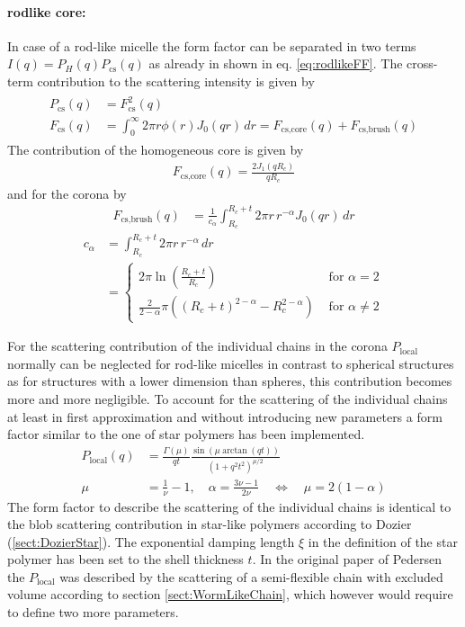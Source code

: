\noindent
\paragraph{rodlike core:}
In case of a rod-like micelle the form factor can be separated in two terms $I(q) =
P_H(q)P_\text{cs}(q)$ as already in shown in eq. \ref{eq:rodlikeFF}. The cross-term contribution to the scattering
intensity is given by
\begin{align}
\begin{split}
P_\text{cs}(q) &=  F_\text{cs}^2(q) \\
F_\text{cs}(q) &= \int_0^\infty 2\pi r \phi(r) J_0(qr)\,dr
                = F_\text{cs,core}(q)+F_\text{cs,brush}(q)
\end{split}
\end{align}
The contribution of the homogeneous core is given by
\begin{align}
F_\text{cs,core}(q) = \frac{2 J_1(qR_c)}{qR_c}
\end{align}
and for the corona by
\begin{align}
F_\text{cs,brush}(q) &=\frac{1}{c_\alpha}\int_{R_c}^{R_c+t} 2\pi r \, r^{-\alpha} J_0(qr)\,dr
\end{align}
\begin{align}
c_\alpha &= \int_{R_c}^{R_c+t} 2\pi r \, r^{-\alpha}\,dr \nonumber \\
&= \begin{cases}
2\pi\ln\left(\frac{R_c+t}{R_c}\right)                                   & \text{~for~} \alpha = 2   \\
\frac{2}{2-\alpha} \pi \left((R_c+t)^{2-\alpha}-R_c^{2-\alpha}\right)   & \text{~for~} \alpha \neq 2
\end{cases}
\end{align}

For the scattering contribution of the individual chains in the corona $P_\text{local}$ normally
can be neglected for rod-like micelles in contrast to spherical structures as for structures
with a lower dimension than spheres, this contribution becomes more and more negligible. To account
for the scattering of the individual chains at least in first approximation and without introducing
new parameters a form factor similar to the one of star polymers has been implemented.
\begin{align}
P_\text{local}(q) &=
             \frac{\Gamma(\mu)}{qt}
             \frac{\sin\left(\mu \arctan(q t)\right)}{\left(1+q^2t^2\right)^{\mu/2}} \\
\mu &=\frac{1}{\nu}-1 ,\quad
\alpha = \frac{3\nu-1}{2\nu} \quad
\Leftrightarrow \quad \mu = 2(1-\alpha) \nonumber
\end{align}
The form factor to describe the scattering of the individual chains
is identical to the blob scattering contribution in star-like polymers according to
Dozier (\ref{sect:DozierStar}). The exponential damping length $\xi$ in the definition of the star
polymer has been set to the shell thickness $t$. In the original
paper of Pedersen the $P_\text{local}$ was described by the scattering of a semi-flexible chain with
excluded volume according to section \ref{sect:WormLikeChain}, which however would require to define
two more parameters.

